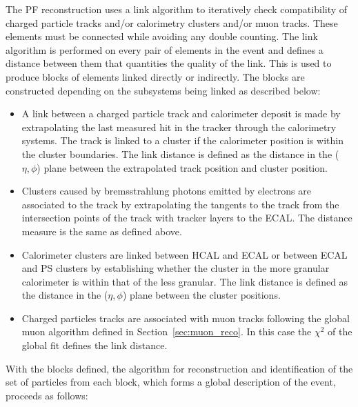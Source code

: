 The PF reconstruction uses a link algorithm to iteratively check compatibility of charged particle tracks 
and/or calorimetry clusters and/or muon tracks. These elements must be connected while avoiding any double counting. 
The link algorithm is performed on every pair of elements in the event and defines a distance between them
that quantities the quality of the link. This is used to produce blocks of elements linked directly 
or indirectly. The blocks are constructed depending on the subsystems being linked as described below:

\begin{itemize}
\item A link between a charged particle track and calorimeter deposit is made by extrapolating the last measured
hit in the tracker through the calorimetry systems. The track is linked to a cluster if the calorimeter position
is within the cluster boundaries. The link distance is defined as the distance in the ($\eta,\phi$) plane between
the extrapolated track position and cluster position.
\item Clusters caused by bremsstrahlung photons emitted by electrons are associated to the track by extrapolating
the tangents to the track from the intersection points of the track with tracker layers to the ECAL. The distance measure
is the same as defined above.
\item Calorimeter clusters are linked between HCAL and ECAL or between ECAL and PS clusters by establishing whether
the cluster in the more granular calorimeter is within that of the less granular. The link distance is defined
as the distance in the ($\eta,\phi$) plane between the cluster positions.
\item Charged particles tracks are associated with muon tracks following the global muon algorithm defined in 
Section~\ref{sec:muon_reco}. In this case the $\chi^2$ of the global fit defines the link distance.
\end{itemize}

With the blocks defined, the algorithm for reconstruction and identification of the set of particles from each
block, which forms a global description of the event, proceeds as follows:

